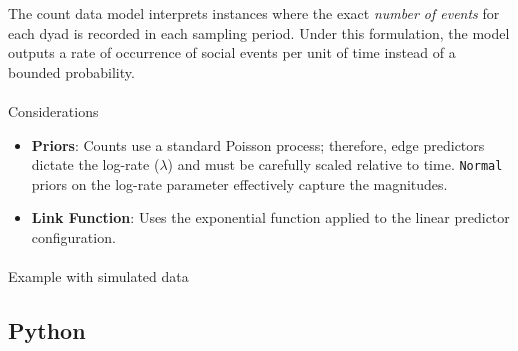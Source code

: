 \documentclass[
  letterpaper,
  DIV=11,
  numbers=noendperiod]{scrartcl}
\makeatletter
\let\oldparagraph\paragraph
\renewcommand{\paragraph}{
    \@ifstar
      \xxxParagraphStar
      \xxxParagraphNoStar
  }
\newcommand{\xxxParagraphStar}[1]{\oldparagraph*{#1}\mbox{}}
\newcommand{\xxxParagraphNoStar}[1]{\oldparagraph{#1}\mbox{}}
\providecommand{\tightlist}{%
  \setlength{\itemsep}{0pt}\setlength{\parskip}{0pt}}
\makeatother
\begin{document}
The count data model interprets instances where the exact \emph{number
of events} for each dyad is recorded in each sampling period. Under this
formulation, the model outputs a rate of occurrence of social events per
unit of time instead of a bounded probability.

\paragraph{Considerations}\label{considerations-1}

\begin{tcolorbox}[enhanced jigsaw, colframe=quarto-callout-note-color-frame, bottomtitle=1mm, coltitle=black, titlerule=0mm, colbacktitle=quarto-callout-note-color!10!white, colback=white, opacitybacktitle=0.6, rightrule=.15mm, toptitle=1mm, opacityback=0, arc=.35mm, left=2mm, title=\textcolor{quarto-callout-note-color}{\faInfo}\hspace{0.5em}{Note}, breakable, bottomrule=.15mm, toprule=.15mm, leftrule=.75mm]

\begin{itemize}
\tightlist
\item
  \textbf{Priors}: Counts use a standard Poisson process; therefore,
  edge predictors dictate the log-rate (\(\lambda\)) and must be
  carefully scaled relative to time. \texttt{Normal} priors on the
  log-rate parameter effectively capture the magnitudes.
\item
  \textbf{Link Function}: Uses the exponential function applied to the
  linear predictor configuration.
\end{itemize}

\end{tcolorbox}

\paragraph{Example with simulated
data}\label{example-with-simulated-data}

\subsection{Python}
\end{document}
